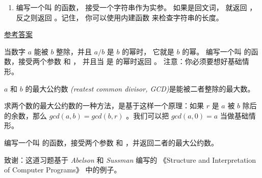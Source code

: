 \begin{exercise}
\begin{enumerate}
\item 编写一个叫 {\em {}} 的函数， 接受一个字符串作为实参。 如果是回文词， 就返回 {\em {}} ，反之则返回 {\em {}} 。记住， 你可以使用内建函数 {\em {}} 来检查字符串的长度。

\end{enumerate}


\href{http://thinkpython2.com/code/palindrome_soln.py}{参考答案}

\end{exercise}

\begin{exercise}


当数字 $a$ 能被  $b$ 整除，并且 $a/b$ 是 $b$ 的幂时， 它就是 $b$ 的幂。
编写一个叫 {\em {}} 的函数，接受两个参数 {\em {}} 和 {\em {}}， 并且当 {\em {}} 是 {\em {}} 的幂时返回 {\em {}}。
注意：你必须要想好基础情形。

\end{exercise}

\begin{exercise}
  


$a$ 和 $b$ 的最大公约数 {\em (reatest common divisor, GCD)}是能被二者整除的最大数。


求两个数的最大公约数的一种方法，是基于这样一个原理：如果 $r$ 是 $a$ 被 $b$ 除后的余数，那么  $gcd(a,b) = gcd(b, r)$ 。我们可以把 $gcd(a, 0) = a$ 当做基础情形。


编写一个叫 {\em {}} 的函数，接受两个参数 {\em {}} 和 {\em {}}，并返回二者的最大公约数。


致谢：这道习题基于 {\em Abelson} 和 {\em Sussman} 编写的 《Structure and Interpretation of Computer Programs》 中的例子。

\end{exercise}
